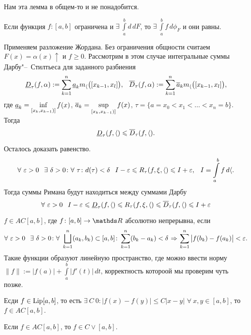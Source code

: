 Нам  эта лемма в общем-то и не понадобится.
\begin{The}
  Если функция $f\colon [a,b]$ ограничена и $\exists\ \int\limits_a^bd\,dF$, то $\exists\ \int\limits_a^b f\,d\phi_F$ и они равны.
\end{The}
\begin{Proof}
  Применяем разложение Жордана. Без ограничения общности считаем $F(x)= \alpha(x)\uparrow$ и $f\ge 0$. Рассмотрим в этом случае интегральные суммы Дарбу"--~Стилтьеса для заданного разбиения
\[
  \underline D_\tau(f,\alpha):=\sum\limits_{k = 1}^{n} \underline a_k m_\langle\big([x_{k-1},x_l]\big),\hskip .75em plus.1em minus.08em\relax \overline{D}_\tau(f,\alpha):=\sum\limits_{k = 1}^{n} \overline{a}_k m_\langle\big([x_{k-1},x_l]\big),
\]
где $\underline a_k = \inf\limits_{[x_k,x_{k-1})]} f(x)$, $\overline{a}_k = \sup\limits_{[x_k,x_{k-1})]} f(x)$, $\tau = \{a=x_0<x_1<\dots<x_n=b\}$. Тогда
\[
 \underline D_\tau(f,\langle)\leqslant \overline{D}_\tau(f,\langle).
\]

Осталось доказать равенство.
\[
  \forall\ \e>0\pau \exists\ \delta>0\colon \forall\ \tau\colon d(\tau)<\delta\pau I-\e\le R_\tau(f,\xi,\a)\le I+\e,
  \pau I = \int\limits_a^bf\,d\a.
\]
Тогда суммы Римана будут находиться между суммами Дарбу
\[
  \forall\ \e>0\pau I-\e\le \ul D_\tau(f,\a)\le R_\tau(f,\xi,\a)\le\ol D_\tau(f,\a) \le I+\e
\]
\end{Proof}

\begin{Def}
  $f\in AC[a,b]$, где $f\colon [a,b]\to\R$ абсолютно непрерывна, если
  \[
   \forall\ \e>0\pau\exists\ \d>0\colon \forall\ \DUN k1n(a_k,b_k)\subset [a,b]\colon \RY k1n(b_k-a_k)<\d\imp\RY k1n\big|f(b_k)-f(a_k)\big|<\e.
\]
Такие функции образуют линейную пространство, где можно ввести норму $\|f\|:=\big|f(a)\big|+\int\limits_a^b\big|f'(t)\big|\,d t$, корректность котороой мы проверим чуть позже.
\end{Def}

\begin{Ut}
  Есди $f\in \operatorname{Lip}[a,b]$, то есть $\exists\ C\>0\colon \big|f(x)-f(y)\big|\le C|x-y|$ $\forall\ x,y\in[a,b]$, то $f\in AC[a,b]$.
\end{Ut}

\begin{Ut}
  Если $f\in AC[a,b]$, то $f\in C\vee [a,b]$.
\end{Ut}

